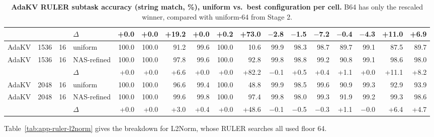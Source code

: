 \begin{table}[t]
\begin{tabular}{@{}l r r l r r r r r r r r r r r r r @{}}
     &  &  & $\Delta$ & +0.0 & +0.0 & +19.2 & +0.0 & +0.2 & +73.0 & $-$2.8 & $-$1.5 & $-$7.2 & $-$0.4 & $-$4.3 & +11.0 & +6.9 \\
    \midrule
    AdaKV & 1536 & 16 & uniform & 100.0 & 100.0 & 91.2 & 99.6 & 100.0 & 10.6 & 99.9 & 98.3 & 98.7 & 89.7 & 99.1 & 87.5 & 89.7 \\
    AdaKV & 1536 & 16 & NAS-refined & 100.0 & 100.0 & 97.8 & 99.6 & 100.0 & 92.8 & 99.8 & 98.8 & 99.2 & 90.8 & 99.1 & 98.6 & 98.0 \\
     &  &  & $\Delta$ & +0.0 & +0.0 & +6.6 & +0.0 & +0.0 & +82.2 & $-$0.1 & +0.5 & +0.4 & +1.1 & +0.0 & +11.1 & +8.2 \\
    \midrule
    AdaKV & 2048 & 16 & uniform & 100.0 & 100.0 & 96.6 & 99.4 & 100.0 & 48.8 & 99.9 & 98.5 & 99.6 & 90.9 & 99.3 & 92.9 & 93.9 \\
    AdaKV & 2048 & 16 & NAS-refined & 100.0 & 100.0 & 99.6 & 99.8 & 100.0 & 97.4 & 99.8 & 98.0 & 99.3 & 91.9 & 99.2 & 99.3 & 98.6 \\
     &  &  & $\Delta$ & +0.0 & +0.0 & +3.0 & +0.4 & +0.0 & +48.6 & $-$0.1 & $-$0.5 & $-$0.3 & +1.1 & $-$0.0 & +6.4 & +4.7 \\
    \bottomrule
  \end{tabular}
  \caption{\textbf{AdaKV RULER subtask accuracy (string match, \%), uniform vs.\ best configuration per cell.} B64 has only the rescaled winner, compared with uniform-64 from Stage 2.}
  \label{tab:app-ruler-adakv}
\end{table}


Table~\ref{tab:app-ruler-l2norm} gives the breakdown for L2Norm, whose RULER searches all used floor 64.


